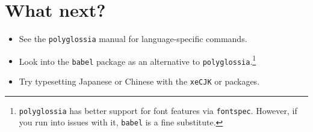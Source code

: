 \section{What next?}
\begin{itemize}
\item See the \texttt{polyglossia} manual for language-specific commands.
\item Look into the \texttt{babel} package as an alternative to
    \texttt{polyglossia}.\punckern\footnote{\texttt{polyglossia} has better
    support for font features via \texttt{fontspec}.
    However, if you run into issues with it,
    \texttt{babel} is a fine substitute.}
\item Try typesetting Japanese or Chinese with the \texttt{xeCJK} or
     packages.
\end{itemize}
